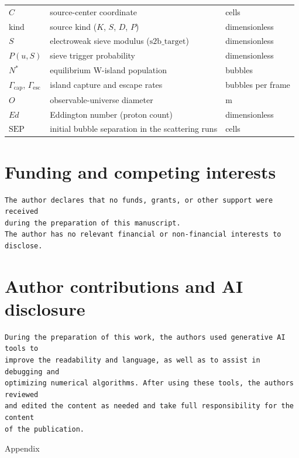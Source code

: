 \documentclass[a4paper]{article}
\begin{document}
\begin{center}
\begin{tabular}{@{}p{2.8cm}p{9.2cm}p{2.8cm}@{}}
$C$ & source-center coordinate & cells\\
$\mathrm{kind}$ & source kind ($K$, $S$, $D$, $P$) & dimensionless\\
$S$ & electroweak sieve modulus ($\mathrm{s2b\_target}$) & dimensionless\\
$P(u,S)$ & sieve trigger probability & dimensionless\\
$N^{*}$ & equilibrium W-island population & bubbles\\
$\Gamma_{\mathrm{cap}}$, $\Gamma_{\mathrm{esc}}$ & island capture and escape rates & bubbles per frame\\
$O$ & observable-universe diameter & m\\
$Ed$ & Eddington number (proton count) & dimensionless\\
$\mathrm{SEP}$ & initial bubble separation in the scattering runs & cells\\
\hline
\end{tabular}
\end{center}

\section*{Funding and competing interests}
\begin{verbatim}
The author declares that no funds, grants, or other support were received
during the preparation of this manuscript.
The author has no relevant financial or non-financial interests to disclose.
\end{verbatim}
\section*{Author contributions and AI disclosure}
\begin{verbatim}
During the preparation of this work, the authors used generative AI tools to
improve the readability and language, as well as to assist in debugging and
optimizing numerical algorithms. After using these tools, the authors reviewed
and edited the content as needed and take full responsibility for the content
of the publication.
\end{verbatim}
\printbibliography
\newpage{}
\appendix
\begin{center}
{\LARGE{}Appendix}{\LARGE\par}
\par\end{center}
\end{document}
